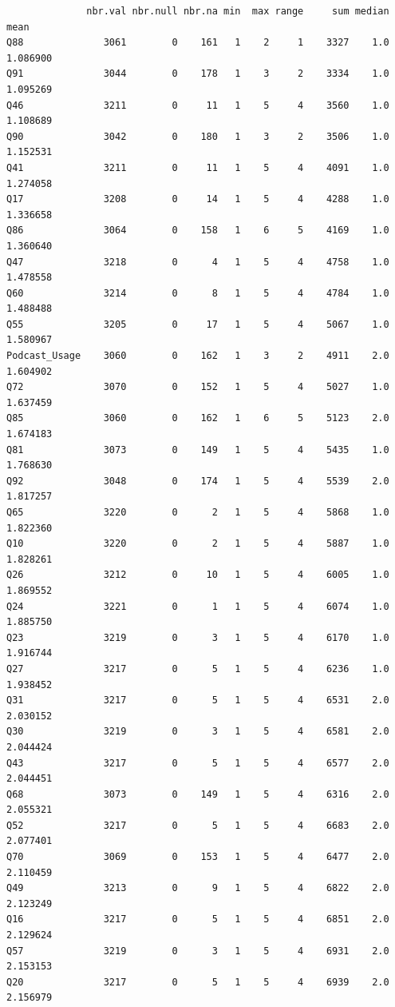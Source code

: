 \documentclass[
]{report}
\begin{document}
\begin{verbatim}
              nbr.val nbr.null nbr.na min  max range     sum median        mean
Q88              3061        0    161   1    2     1    3327    1.0    1.086900
Q91              3044        0    178   1    3     2    3334    1.0    1.095269
Q46              3211        0     11   1    5     4    3560    1.0    1.108689
Q90              3042        0    180   1    3     2    3506    1.0    1.152531
Q41              3211        0     11   1    5     4    4091    1.0    1.274058
Q17              3208        0     14   1    5     4    4288    1.0    1.336658
Q86              3064        0    158   1    6     5    4169    1.0    1.360640
Q47              3218        0      4   1    5     4    4758    1.0    1.478558
Q60              3214        0      8   1    5     4    4784    1.0    1.488488
Q55              3205        0     17   1    5     4    5067    1.0    1.580967
Podcast_Usage    3060        0    162   1    3     2    4911    2.0    1.604902
Q72              3070        0    152   1    5     4    5027    1.0    1.637459
Q85              3060        0    162   1    6     5    5123    2.0    1.674183
Q81              3073        0    149   1    5     4    5435    1.0    1.768630
Q92              3048        0    174   1    5     4    5539    2.0    1.817257
Q65              3220        0      2   1    5     4    5868    1.0    1.822360
Q10              3220        0      2   1    5     4    5887    1.0    1.828261
Q26              3212        0     10   1    5     4    6005    1.0    1.869552
Q24              3221        0      1   1    5     4    6074    1.0    1.885750
Q23              3219        0      3   1    5     4    6170    1.0    1.916744
Q27              3217        0      5   1    5     4    6236    1.0    1.938452
Q31              3217        0      5   1    5     4    6531    2.0    2.030152
Q30              3219        0      3   1    5     4    6581    2.0    2.044424
Q43              3217        0      5   1    5     4    6577    2.0    2.044451
Q68              3073        0    149   1    5     4    6316    2.0    2.055321
Q52              3217        0      5   1    5     4    6683    2.0    2.077401
Q70              3069        0    153   1    5     4    6477    2.0    2.110459
Q49              3213        0      9   1    5     4    6822    2.0    2.123249
Q16              3217        0      5   1    5     4    6851    2.0    2.129624
Q57              3219        0      3   1    5     4    6931    2.0    2.153153
Q20              3217        0      5   1    5     4    6939    2.0    2.156979

\end{verbatim}
\end{document}

